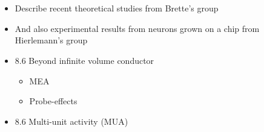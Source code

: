 
\section{} 

\section{}
\begin{itemize}
\item Describe recent theoretical studies from Brette's group
\item And also experimental results from neurons grown on a chip from Hierlemann's group
\end{itemize}


\begin{itemize}
\item 8.6 Beyond infinite volume conductor
\begin{itemize}
\item MEA
\item Probe-effects
\end{itemize}
\item 8.6 Multi-unit activity (MUA)
\end{itemize} 


